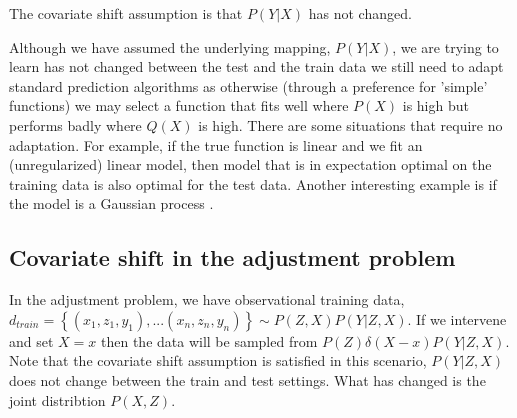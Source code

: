\documentclass{article}
\newcommand{\set}[1]{\left\{#1\right\}}
\theoremstyle{plain}
\theoremstyle{definition}
\begin{document}
The covariate shift assumption is that $P(Y|X)$ has not changed. 


Although we have assumed the underlying mapping, $P(Y|X)$, we are trying to learn has not changed between the test and the train data we still need to adapt standard prediction algorithms as otherwise (through a preference for 'simple' functions) we may select a function that fits well where $P(X)$ is high but performs badly where $Q(X)$ is high. There are some situations that require no adaptation. For example, if the true function is linear and we fit an (unregularized) linear model, then model that is in expectation optimal on the training data is also optimal for the test data. Another interesting example is if the model is a Gaussian process \cite{}. 

\subsection*{Covariate shift in the adjustment problem}

In the adjustment problem, we have observational training data, $d_{train} = \set{(x_1,z_1,y_1),...(x_n,z_n,y_n)} \sim P(Z,X)P(Y|Z,X)$. If we intervene and set $X=x$ then the data will be sampled from $P(Z)\delta(X-x)P(Y|Z,X)$. Note that the covariate shift assumption is satisfied in this scenario, $P(Y|Z,X)$ does not change between the train and test settings. What has changed is the joint distribtion $P(X,Z)$.
\end{document}
